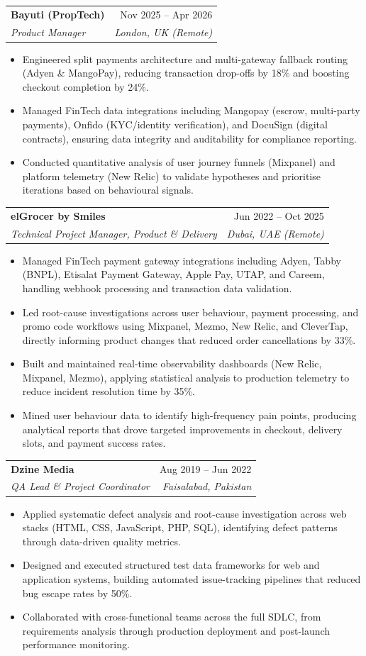 \documentclass[letterpaper,10pt]{article}
\makeatletter
\newcommand{\resumeItem}[1]{
  \item\small{
    {#1 \vspace{-2pt}}
  }
}
\newcommand{\resumeSubheading}[4]{
  \vspace{-2pt}\item
    \begin{tabular*}{0.97\textwidth}[t]{l@{\extracolsep{\fill}}r}
      \textbf{#1} & #2 \\
      \textit{\small#3} & \textit{\small #4} \\
    \end{tabular*}\vspace{-7pt}
}
\newcommand{\resumeItemListStart}{\begin{itemize}[leftmargin=0.15in]}
\newcommand{\resumeItemListEnd}{\end{itemize}\vspace{-5pt}}
\makeatother
\begin{document}
    \resumeSubheading
      {Bayuti (PropTech)}{Nov 2025 – Apr 2026}
      {Product Manager}{London, UK (Remote)}
      \resumeItemListStart
        \resumeItem{Engineered split payments architecture and multi-gateway fallback routing (Adyen \& MangoPay), reducing transaction drop-offs by 18\% and boosting checkout completion by 24\%.}
        \resumeItem{Managed FinTech data integrations including Mangopay (escrow, multi-party payments), Onfido (KYC/identity verification), and DocuSign (digital contracts), ensuring data integrity and auditability for compliance reporting.}
        \resumeItem{Conducted quantitative analysis of user journey funnels (Mixpanel) and platform telemetry (New Relic) to validate hypotheses and prioritise iterations based on behavioural signals.}
      \resumeItemListEnd

    \resumeSubheading
      {elGrocer by Smiles}{Jun 2022 – Oct 2025}
      {Technical Project Manager, Product \& Delivery}{Dubai, UAE (Remote)}
      \resumeItemListStart
        \resumeItem{Managed FinTech payment gateway integrations including Adyen, Tabby (BNPL), Etisalat Payment Gateway, Apple Pay, UTAP, and Careem, handling webhook processing and transaction data validation.}
        \resumeItem{Led root-cause investigations across user behaviour, payment processing, and promo code workflows using Mixpanel, Mezmo, New Relic, and CleverTap, directly informing product changes that reduced order cancellations by 33\%.}
        \resumeItem{Built and maintained real-time observability dashboards (New Relic, Mixpanel, Mezmo), applying statistical analysis to production telemetry to reduce incident resolution time by 35\%.}
        \resumeItem{Mined user behaviour data to identify high-frequency pain points, producing analytical reports that drove targeted improvements in checkout, delivery slots, and payment success rates.}
      \resumeItemListEnd

    \resumeSubheading
      {Dzine Media}{Aug 2019 – Jun 2022}
      {QA Lead \& Project Coordinator}{Faisalabad, Pakistan}
      \resumeItemListStart
        \resumeItem{Applied systematic defect analysis and root-cause investigation across web stacks (HTML, CSS, JavaScript, PHP, SQL), identifying defect patterns through data-driven quality metrics.}
        \resumeItem{Designed and executed structured test data frameworks for web and application systems, building automated issue-tracking pipelines that reduced bug escape rates by 50\%.}
        \resumeItem{Collaborated with cross-functional teams across the full SDLC, from requirements analysis through production deployment and post-launch performance monitoring.}
      \resumeItemListEnd
\end{document}
